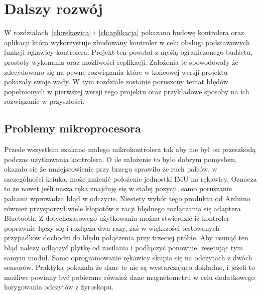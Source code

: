\section{Dalszy rozwój}
\label{sec:rozwoj}
 W rozdziałach~\ref{ch:rekawica} i~\ref{ch:aplikacja} pokazano budowę kontrolera oraz aplikacji która wykorzystuje zbudowany kontroler w celu obsługi podstawowych funkcji rękawicy-kontrolera. Projekt ten powstał z myślą ograniczonego budżetu, prostoty wykonania oraz możliwości replikacji. Założenia te spowodowały że zdecydowano się na pewne rozwiązania które w końcowej wersji projektu pokazały swoje wady. W tym rozdziale zostanie poruszony temat błędów popełnionych w pierwszej wersji tego projektu oraz przykładowe sposoby na ich rozwiązanie w przyszłości. 
 
 \subsection{Problemy mikroprocesora}
 \label{subsec:iuMikroprocesor}
 Przede wszystkim szukano małego mikrokontrolera tak aby nie był on przeszkodą podczas użytkowania kontrolera. O ile założenie to było dobrym pomysłem, okazało się że umiejscowienie przy brzegu sprawiło że ruch palców, w szczególności kciuka, może zmienić położenie jednostki IMU na rękawicy. Oznacza to że nawet jeśli nasza ręka znajduję się w stałej pozycji, samo poruszanie palcami wprowadza błąd w odczycie. Niestety wybór tego produktu od Arduino również przysporzył wiele kłopotów z racji błędnego rozłączania się adaptera Bluetooth. Z dotychczasowego użytkowania można stwierdzić iż kontroler poprawnie łączy się i rozłącza dwa razy, zaś w większości testowanych przypadków dochodzi do błędu połączenia przy trzeciej próbie. Aby usunąć ten błąd należy odłączyć płytkę od zasilania i podłączyć ponownie, resetując tym samym moduł. Samo oprogramowanie rękawicy skupia się na odczytach z dwóch sensorów. Praktyka pokazała że dane te nie są wystarczająco dokładne, i jeżeli to możliwe powinny być pobierane również dane magnetometru w celu dodatkowego korygowania odczytów z żyroskopu. 
 

